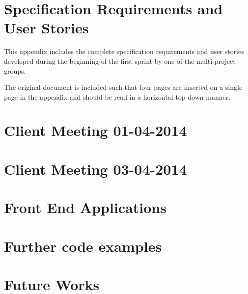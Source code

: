 \chapter{Specification Requirements and User Stories}\label{appendix:requirements}
This appendix includes the complete specification requirements and user stories developed during the beginning of the first sprint by one of the multi-project groups.

The original document is included such that four pages are inserted on a single page in the appendix and should be read in a horizontal top-down manner.



\chapter{Client Meeting 01-04-2014}\label{appendix:firstmeeting}


\chapter{Client Meeting 03-04-2014}\label{appendix:secondmeeting}


\chapter{Front End Applications}\label{sec:giraf:applications:frontend}


\chapter{Further code examples}\label{appendix:codeexamples}


\chapter{Future Works}\label{appendix:futureworks}
